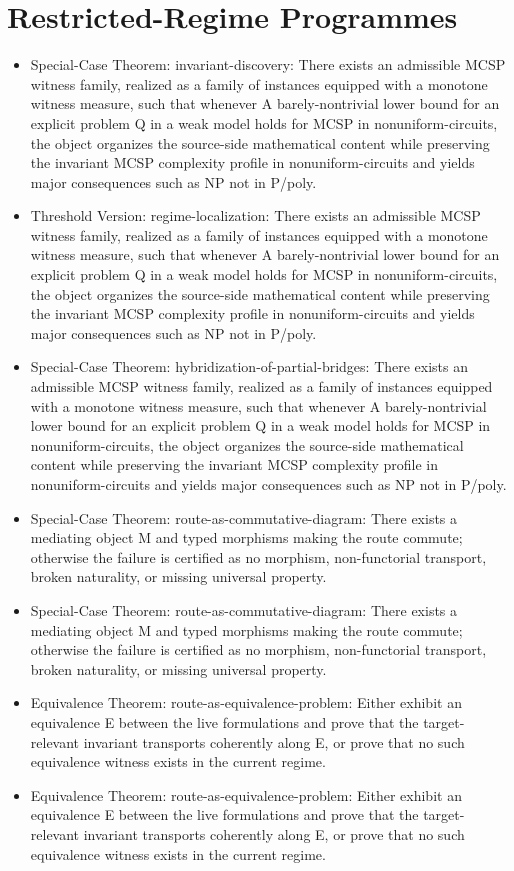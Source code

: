 \documentclass[11pt]{article}
\begin{document}
\section*{Restricted-Regime Programmes}
\begin{itemize}
\item Special-Case Theorem: invariant-discovery: There exists an admissible MCSP witness family, realized as a family of instances equipped with a monotone witness measure, such that whenever A barely-nontrivial lower bound for an explicit problem Q in a weak model holds for MCSP in nonuniform-circuits, the object organizes the source-side mathematical content while preserving the invariant MCSP complexity profile in nonuniform-circuits and yields major consequences such as NP not in P/poly.
\item Threshold Version: regime-localization: There exists an admissible MCSP witness family, realized as a family of instances equipped with a monotone witness measure, such that whenever A barely-nontrivial lower bound for an explicit problem Q in a weak model holds for MCSP in nonuniform-circuits, the object organizes the source-side mathematical content while preserving the invariant MCSP complexity profile in nonuniform-circuits and yields major consequences such as NP not in P/poly.
\item Special-Case Theorem: hybridization-of-partial-bridges: There exists an admissible MCSP witness family, realized as a family of instances equipped with a monotone witness measure, such that whenever A barely-nontrivial lower bound for an explicit problem Q in a weak model holds for MCSP in nonuniform-circuits, the object organizes the source-side mathematical content while preserving the invariant MCSP complexity profile in nonuniform-circuits and yields major consequences such as NP not in P/poly.
\item Special-Case Theorem: route-as-commutative-diagram: There exists a mediating object M and typed morphisms making the route commute; otherwise the failure is certified as no morphism, non-functorial transport, broken naturality, or missing universal property.
\item Special-Case Theorem: route-as-commutative-diagram: There exists a mediating object M and typed morphisms making the route commute; otherwise the failure is certified as no morphism, non-functorial transport, broken naturality, or missing universal property.
\item Equivalence Theorem: route-as-equivalence-problem: Either exhibit an equivalence E between the live formulations and prove that the target-relevant invariant transports coherently along E, or prove that no such equivalence witness exists in the current regime.
\item Equivalence Theorem: route-as-equivalence-problem: Either exhibit an equivalence E between the live formulations and prove that the target-relevant invariant transports coherently along E, or prove that no such equivalence witness exists in the current regime.
\end{itemize}
\end{document}
